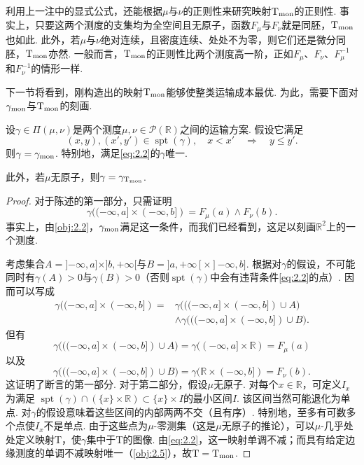 \begin{remark}\label{obj:2.7}
利用上一注中的显式公式，还能根据$\mu$与$\nu$的正则性来研究映射$\mathrm T_{\rm mon}$的正则性. 事实上，只要这两个测度的支集均为全空间且无原子，函数$F_\mu$与$F_\nu$就是同胚，$\mathrm T_{\rm mon}$也如此. 此外，若$\mu$与$\nu$绝对连续，且密度连续、处处不为零，则它们还是微分同胚，$\mathrm T_{\rm mon}$亦然. 一般而言，$\mathrm T_{\rm mon}$的正则性比两个测度高一阶，正如$F_\mu$、$F_\nu$、$F_\mu^{-1}$和$F_\nu^{-1}$的情形一样.
\end{remark}

下一节将看到，刚构造出的映射$\mathrm T_{\rm mon}$能够使整类运输成本最优. 为此，需要下面对$\gamma_{\rm mon}$与$\mathrm T_{\rm mon}$的刻画.

\begin{lemma}\label{obj:2.8}
设$\gamma\in\Pi(\mu,\nu)$是两个测度$\mu,\nu\in\mathscr P(\mathbb R)$之间的运输方案. 假设它满足
\begin{equation}\label{eq:2.2}
(x,y),(x',y')\in\operatorname{spt}(\gamma),\quad x<x'\quad\Longrightarrow\quad y\le y'.
\end{equation}
则$\gamma=\gamma_{\rm mon}$. 特别地，满足\eqref{eq:2.2}的$\gamma$唯一.

此外，若$\mu$无原子，则$\gamma=\gamma_{\mathrm T_{\rm mon}}$.
\end{lemma}
\begin{proof}
对于陈述的第一部分，只需证明
\[
\gamma(({-\infty},a]\times({-\infty},b])=F_\mu(a)\wedge F_\nu(b).
\]
事实上，由\autoref{obj:2.2}，$\gamma_{\rm mon}$满足这一条件，而我们已经看到，这足以刻画$\mathbb R^2$上的一个测度.

考虑集合$A=]{-\infty},a]\times]b,+\infty[$与$B=]a,+\infty[\times]{-\infty},b]$. 根据对$\gamma$的假设，不可能同时有$\gamma(A)>0$与$\gamma(B)>0$（否则$\operatorname{spt}(\gamma)$中会有违背条件\eqref{eq:2.2}的点）. 因而可以写成
\[
\begin{aligned}
\gamma(({-\infty},a]\times({-\infty},b])
={}&\gamma\bigl((({-\infty},a]\times({-\infty},b])\cup A\bigr)\\
&\wedge\gamma\bigl((({-\infty},a]\times({-\infty},b])\cup B\bigr).
\end{aligned}
\]
但有
\[
\gamma\bigl((({-\infty},a]\times({-\infty},b])\cup A\bigr)
=\gamma(({-\infty},a]\times\mathbb R)=F_\mu(a)
\]
以及
\[
\gamma\bigl((({-\infty},a]\times({-\infty},b])\cup B\bigr)
=\gamma(\mathbb R\times({-\infty},b])=F_\nu(b).
\]
这证明了断言的第一部分. 对于第二部分，假设$\mu$无原子. 对每个$x\in\mathbb R$，可定义$I_x$为满足
$\operatorname{spt}(\gamma)\cap(\{x\}\times\mathbb R)\subset\{x\}\times I$的最小区间$I$. 该区间当然可能退化为单点. 对$\gamma$的假设意味着这些区间的内部两两不交（且有序）. 特别地，至多有可数多个点使$I_x$不是单点. 由于这些点为$\mu$-零测集（这是$\mu$无原子的推论），可以$\mu$-几乎处处定义映射$\mathrm T$，使$\gamma$集中于$\mathrm T$的图像. 由\eqref{eq:2.2}，这一映射单调不减；而具有给定边缘测度的单调不减映射唯一（\autoref{obj:2.5}），故$\mathrm T=\mathrm T_{\rm mon}$.
\end{proof}
